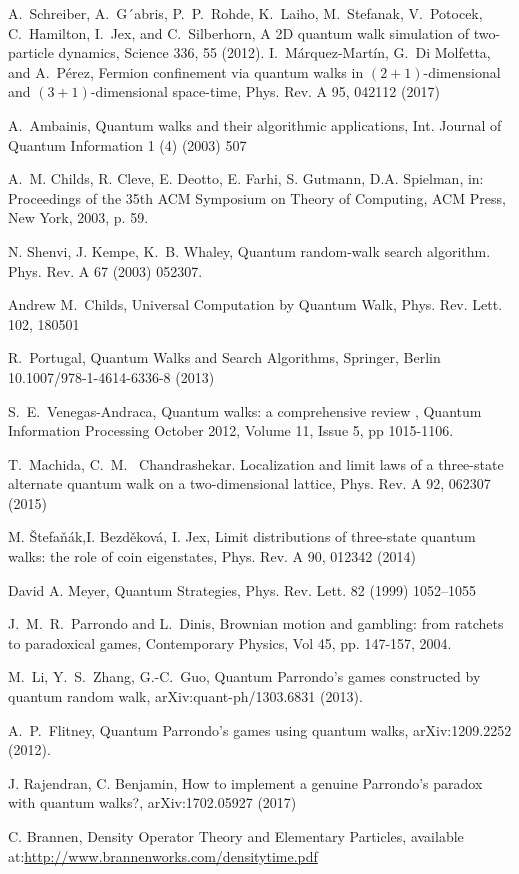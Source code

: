 \documentclass[english,aps,pra,amsmath,amssymb,showpacs,notitlepage,onecolumn]{revtex4-1}
\def\pra{Phys. Rev. A }
\def\prl{Phys. Rev. Lett. }
\begin{document}
\begin{thebibliography}{99}
A.~Schreiber, A.~G´abris, P.~P.~Rohde, K.~Laiho, M.~Stefanak, V.~Potocek, C.~Hamilton, I.~Jex, and C.~Silberhorn, A 2D quantum
walk simulation of two-particle dynamics, Science 336, 55
(2012).
I.~M\'arquez-Martín, G.~Di Molfetta, and A.~P\'erez, Fermion confinement via quantum walks in $(2+1)$-dimensional and $(3+1)$-dimensional space-time, Phys. Rev. A 95, 042112 (2017)

A.~Ambainis, Quantum walks and their algorithmic applications, Int. Journal of Quantum Information 1 (4) (2003) 507

A.~M. Childs, R. Cleve, E. Deotto, E. Farhi, S. Gutmann, D.A. Spielman, in: Proceedings of the 35th ACM Symposium on Theory of Computing, ACM Press, New York, 2003, p. 59.

N. Shenvi, J. Kempe, K.~B. Whaley, Quantum random-walk search algorithm. \pra 67 (2003) 052307.

Andrew M.~Childs, Universal Computation by Quantum Walk, Phys. Rev. Lett. 102, 180501 

R.~Portugal, Quantum Walks and Search Algorithms, Springer, Berlin 10.1007/978-1-4614-6336-8 (2013) 


S.~E.~Venegas-Andraca, Quantum walks: a comprehensive review , Quantum Information Processing October 2012, Volume 11, Issue 5, pp 1015-1106.

T.~Machida, C.~M.~ Chandrashekar. Localization and limit laws of a three-state alternate quantum walk on a two-dimensional lattice, \pra 92, 062307 (2015)

M. \v Stefa\v n\'ak,I. Bezd\v ekov\'a, I. Jex, Limit distributions of three-state quantum walks: the role of coin eigenstates, \pra 90, 012342 (2014)

David A. Meyer, Quantum Strategies, \prl 82 (1999) 1052–1055

J.~M.~R.~Parrondo and L.~Dinis, Brownian motion and gambling: from ratchets to paradoxical games, Contemporary Physics, Vol 45, pp. 147-157, 2004.

M.~Li, Y.~S.~Zhang, G.-C.~Guo, Quantum Parrondo's games constructed by quantum random walk, arXiv:quant-ph/1303.6831 (2013).

A.~P.~Flitney, Quantum Parrondo's games using quantum walks, arXiv:1209.2252 (2012).

J. Rajendran, C. Benjamin, How to implement a genuine Parrondo's paradox with quantum walks?, arXiv:1702.05927 (2017)

C. Brannen, Density Operator Theory and Elementary Particles, available at:\url{http://www.brannenworks.com/densitytime.pdf}

\end{thebibliography}
\end{document}
